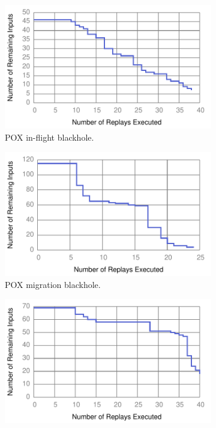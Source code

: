 \begin{figure}[!htb]
\begin{subfigure}{0.32\textwidth}
    \includegraphics[width=\textwidth]{../graphs/runtime/pox_blackhole.pdf}
    \caption[]{\label{fig:pox_discovery} POX in-flight blackhole. }
\end{subfigure}\hfill
\begin{subfigure}{0.32\textwidth}
    \includegraphics[width=\textwidth]{../graphs/runtime/pox_migration_blackhole.pdf}
    \caption[]{\label{fig:pox_migration} POX migration blackhole. }
\end{subfigure}\hfill
\begin{subfigure}{0.32\textwidth}
    \includegraphics[width=\textwidth]{../graphs/runtime/nox_loop.pdf}

\end{subfigure}
\end{figure}
